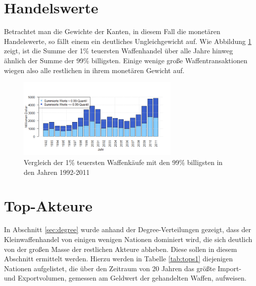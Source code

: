 \documentclass[a4paper,ngerman,oneside,titlepage,bibliography=totoc,11pt]{scrreprt}
\begin{document}
\section{Handelswerte}


Betrachtet man die Gewichte der Kanten, in diesem Fall die monetären Handelswerte, so fällt einem ein deutliches Ungleichgewicht auf. Wie Abbildung \ref{fig:ts_value} zeigt, ist die Summe der 1\% teuersten Waffenhandel über alle Jahre hinweg ähnlich der Summe der 99\% billigsten. Einige wenige große Waffentransaktionen wiegen also alle restlichen in ihrem monetären Gewicht auf. 
\begin{figure}[ht]
	\centering
		\includegraphics[width=0.7\textwidth]{Grafiken/ts_value.png}
	\caption{Vergleich der 1\% teuersten Waffenkäufe mit den 99\% billigsten in den Jahren 1992-2011}
	\label{fig:ts_value}
\end{figure}

\section{Top-Akteure}
\label{sec:top-akteure}
In Abschnitt \ref{sec:degree} wurde anhand der Degree-Verteilungen gezeigt, dass der Kleinwaffenhandel von einigen wenigen Nationen dominiert wird, die sich deutlich von der großen Masse der restlichen Akteure abheben. Diese sollen in diesem Abschnitt ermittelt werden. Hierzu werden in Tabelle \ref{tab:tops1} diejenigen Nationen aufgelistet, die über den Zeitraum von 20 Jahren das größte Import- und Exportvolumen, gemessen am Geldwert der gehandelten Waffen, aufweisen. 
\end{document}
